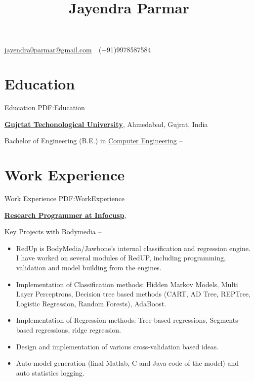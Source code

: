 \documentclass[letterpaper,MMMyyyy,nonstop]{simpleresumecv}
\newcommand{\CVAuthor}{Jayendra Parmar}
\begin{document}

\title{\CVAuthor}

\begin{subtitle}
\par
\href{mailto:jayendra0parmar@gmail.com}
{jayendra0parmar@gmail.com}
\,\SubBulletSymbol\,
(+91)9978587584
\,\SubBulletSymbol\,
\href{\CVWebpage}
{\CVWebpage}
\end{subtitle}

\begin{body}


\section
{Education}
{Education}
{PDF:Education}

\href{http://www.example.com/my-university}
{\textbf{Gujrtat Techonological University}},
Ahmedabad, Gujrat, India

\GapNoBreak
\BulletItem
Bachelor of Engineering (B.E.) in
\href{http://www.example.com/my-department}
{Computer Engineering}
\hfill
{} --


\section
{Work Experience}
{Work Experience}
{PDF:WorkExperience}


\href{http://www.infocusp.in}
{\textbf{Research Programmer at Infocusp}},

\GapNoBreak
\BulletItem
Key Projects with Bodymedia
\hfill
{} --
\begin{detail}
  \begin{itemize}
      \item RedUp is BodyMedia/Jawbone’s internal classification and regression engine.
I have worked on several modules of RedUP, including programming, validation
and model building from the engines.
      \item Implementation of Classification methods: Hidden Markov Models, Multi Layer
Perceptrons, Decision tree based methods (CART, AD Tree, REPTree, Logistic
Regression, Random Forests), AdaBoost.
      \item Implementation of Regression methods: Tree-based regressions, Segments-based
regressions, ridge regression.
      \item Design and implementation of various cross-validation based ideas.
      \item Auto-model generation (final Matlab, C and Java code of the model) and auto statistics
logging.
\end{itemize}
\end{detail}


\end{body}
\end{document}
